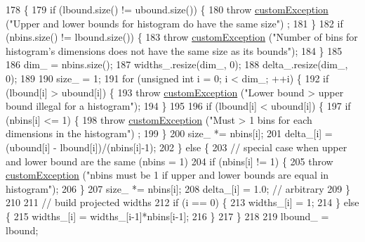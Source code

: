 \begin{DoxyCode}
178                                                                                                            
                                 \{
179     \textcolor{keywordflow}{if} (lbound.size() != ubound.size()) \{
180         \textcolor{keywordflow}{throw} \hyperlink{classcustom_exception}{customException} (\textcolor{stringliteral}{"Upper and lower bounds for histogram do have the same size"})
      ;
181     \}
182     \textcolor{keywordflow}{if} (nbins.size() != lbound.size()) \{
183         \textcolor{keywordflow}{throw} \hyperlink{classcustom_exception}{customException} (\textcolor{stringliteral}{"Number of bins for histogram's dimensions does not have the
       same size as its bounds"});
184     \}
185 
186     dim\_ = nbins.size();
187     widths\_.resize(dim\_, 0);
188     delta\_.resize(dim\_, 0);
189 
190     size\_ = 1;
191     \textcolor{keywordflow}{for} (\textcolor{keywordtype}{unsigned} \textcolor{keywordtype}{int} i = 0; i < dim\_; ++i) \{
192         \textcolor{keywordflow}{if} (lbound[i] > ubound[i]) \{
193             \textcolor{keywordflow}{throw} \hyperlink{classcustom_exception}{customException} (\textcolor{stringliteral}{"Lower bound > upper bound illegal for a histogram"});
194         \}
195 
196         \textcolor{keywordflow}{if} (lbound[i] < ubound[i]) \{
197             \textcolor{keywordflow}{if} (nbins[i] <= 1) \{
198                 \textcolor{keywordflow}{throw} \hyperlink{classcustom_exception}{customException} (\textcolor{stringliteral}{"Must > 1 bins for each dimensions in the histogram"})
      ;
199             \}
200             size\_ *= nbins[i];
201             delta\_[i] = (ubound[i] - lbound[i])/(nbins[i]-1);
202         \} \textcolor{keywordflow}{else} \{
203             \textcolor{comment}{// special case when upper and lower bound are the same (nbins = 1)}
204             \textcolor{keywordflow}{if} (nbins[i] != 1) \{
205                 \textcolor{keywordflow}{throw} \hyperlink{classcustom_exception}{customException} (\textcolor{stringliteral}{"nbins must be 1 if upper and lower bounds are equal
       in histogram"});
206             \}
207             size\_ *= nbins[i];
208             delta\_[i] = 1.0; \textcolor{comment}{// arbitrary}
209         \}
210 
211         \textcolor{comment}{// build projected widths}
212         \textcolor{keywordflow}{if} (i == 0) \{
213             widths\_[i] = 1;
214         \} \textcolor{keywordflow}{else} \{
215             widths\_[i] = widths\_[i-1]*nbins[i-1];
216         \}
217     \}
218 
219     lbound\_ = lbound;

\end{DoxyCode}
